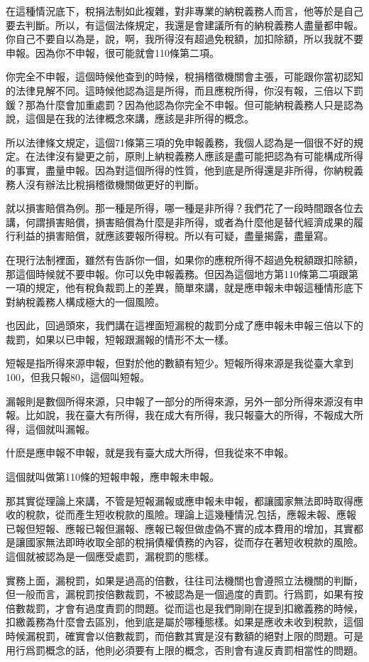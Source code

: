 \documentclass[]{ctexbook}
\begin{document}
在這種情況底下，稅捐法制如此複雜，對非專業的納稅義務人而言，他等於是自己要去判斷。所以，有這個法條規定，我還是會建議所有的納稅義務人盡量都申報。你自己不要自以為是，說，啊，我所得沒有超過免稅額，加扣除額，所以我就不要申報。因為你不申報，很可能就會110條第二項。

你完全不申報，這個時候他查到的時候，稅捐稽徵機關會主張，可能跟你當初認知的法律見解不同。這時候他認為這是所得，而且應稅所得，你沒有報，三倍以下罰鍰？那為什麼會加重處罰？因為他認為你完全不申報。但可能納稅義務人只是認為說，這個是在我的法律概念來講，應該是非所得的概念。

所以法律條文規定，這個71條第三項的免申報義務，我個人認為是一個很不好的規定。在法律沒有變更之前，原則上納稅義務人應該是盡可能把認為有可能構成所得的事實，盡量申報。因為對這個所得的性質，他到底是所得還是非所得，你納稅義務人沒有辦法比稅捐稽徵機關做更好的判斷。

就以損害賠償為例。那一種是所得，哪一種是非所得？我們花了一段時間跟各位去講，何謂損害賠償，損害賠償為什麼是非所得，或者為什麼他是替代經濟成果的履行利益的損害賠償，就應該要報所得稅。所以有可疑，盡量揭露，盡量寫。

在現行法制裡面，雖然有告訴你一個，如果你的應稅所得不超過免稅額跟扣除額，那這個時候就不要申報。你可以免申報義務。但因為這個地方第110條第二項跟第一項的規定，他有稅負裁罰上的差異，簡單來講，就是應申報未申報這種情形底下對納稅義務人構成極大的一個風險。

也因此，回過頭來，我們講在這裡面短漏稅的裁罰分成了應申報未申報三倍以下的裁罰，如果以已申報，短報跟漏報的情形不太一樣。

短報是指所得來源申報，但對於他的數額有短少。短報所得來源是我從臺大拿到100，但我只報80，這個叫短報。

漏報則是數個所得來源，只申報了一部分的所得來源，另外一部分所得來源沒有申報。比如說，我在臺大有所得，我在成大有所得，我只報臺大的所得，不報成大所得，這個就叫漏報。

什麽是應申報不申報，就是我有臺大成大所得，但我從來不申報。

這個就叫做第110條的短報申報，應申報未申報。

那其實從理論上來講，不管是短報漏報或應申報未申報，都讓國家無法即時取得應收的稅款，從而產生短收稅款的風險。理論上這幾種情況,包括，應報未報、應報已報但短報、應報已報但漏報、應報已報但做虛偽不實的成本費用的增加，其實都是讓國家無法即時收取全部的稅捐債權債務的內容，從而存在著短收稅款的風險。這個就被認為是一個應受處罰，漏稅罰的態樣。

實務上面，漏稅罰，如果是過高的倍數，往往司法機關也會遵照立法機關的判斷，但一般而言，漏稅罰按倍數裁罰，不被認為是一個過度的責罰。行爲罰，如果有按倍數裁罰，才會有過度責罰的問題。從而這也是我們剛剛在提到扣繳義務的時候，扣繳義務為什麼會去區別，他到底是屬於哪種態樣。如果是應收未收到稅款，這個時候漏稅罰，確實會以倍數裁罰，而倍數其實是沒有數額的絕對上限的問題。可是用行爲罰概念的話，他則必須要有上限的概念，否則會有違反責罰相當性的問題。
\end{document}
